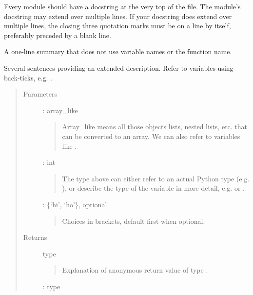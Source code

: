 \documentclass[letterpaper,10pt,english]{sphinxmanual}
\begin{document}
Every module should have a docstring at the very top of the file.  The
module’s docstring may extend over multiple lines.  If your docstring does
extend over multiple lines, the closing three quotation marks must be on
a line by itself, preferably preceded by a blank line.

\begin{fulllineitems}
\label{\detokenize{subMod:trianglelib.subMod.subFunc.foo}}
A one-line summary that does not use variable names or the
function name.

Several sentences providing an extended description. Refer to
variables using back-ticks, e.g. .
\begin{quote}\begin{description}
\item[{Parameters}] \leavevmode
{} : array\_like
\begin{quote}

Array\_like means all those objects \textendash{} lists, nested lists, etc. \textendash{}
that can be converted to an array.  We can also refer to
variables like .
\end{quote}

 : int
\begin{quote}

The type above can either refer to an actual Python type
(e.g. ), or describe the type of the variable in more
detail, e.g.  or .
\end{quote}

 : \{‘hi’, ‘ho’\}, optional
\begin{quote}

Choices in brackets, default first when optional.
\end{quote}

\item[{Returns}] \leavevmode
type
\begin{quote}

Explanation of anonymous return value of type .
\end{quote}

 : type
\begin{quote}


\end{quote}
\end{description}
\end{quote}
\end{fulllineitems}
\end{document}
